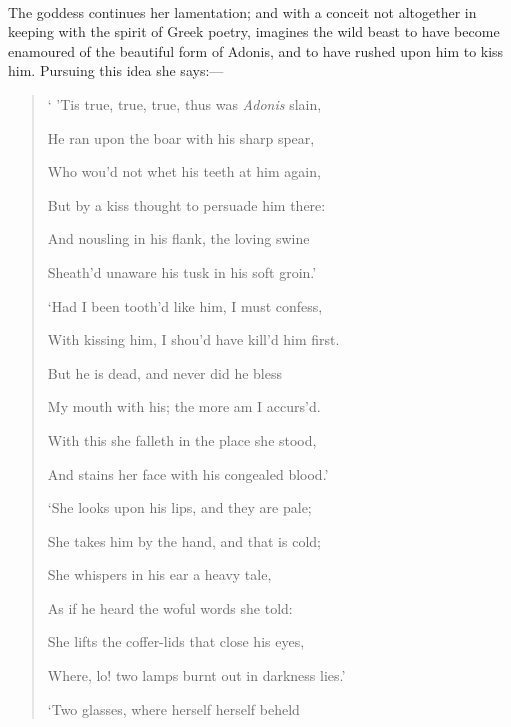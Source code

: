 \documentclass[a4paper, 11pt, oneside, polutonikogreek, english]{article}
\begin{document}
\paragraph{}
The goddess continues her lamentation; and with a conceit not altogether in keeping with the spirit of Greek poetry, imagines the wild beast to have become enamoured of the beautiful form of Adonis, and to have rushed upon him to kiss him. Pursuing this idea she says:---
\begin{quotation}\footnotesize
` 'Tis true, true, true, thus was \emph{Adonis} slain,

He ran upon the boar with his sharp spear,

Who wou'd not whet his teeth at him again,

But by a kiss thought to persuade him there:

\hspace*{15mm}And nousling in his flank, the loving swine

\hspace*{15mm}Sheath'd unaware his tusk in his soft groin.'

\bigskip

`Had I been tooth'd like him, I must confess,

With kissing him, I shou'd have kill'd him first.

But he is dead, and never did he bless

My mouth with his; the more am I accurs'd.

\hspace*{15mm}With this she falleth in the place she stood,

\hspace*{15mm}And stains her face with his congealed blood.'

\bigskip

`She looks upon his lips, and they are pale;

She takes him by the hand, and that is cold;

She whispers in his ear a heavy tale,

As if he heard the woful words she told:

\hspace*{15mm}She lifts the coffer-lids that close his eyes,

\hspace*{15mm}Where, lo! two lamps burnt out in darkness lies.'

\bigskip

`Two glasses, where herself herself beheld


\end{quotation}
\end{document}
